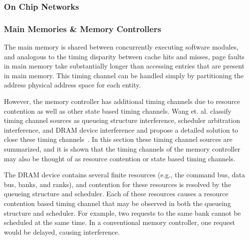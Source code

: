 \subsubsection{On Chip Networks}
\subsubsection{Main Memories \& Memory Controllers}
The main memory is shared between concurrently executing software modules, and 
analogous to the timing disparity between cache hits and misses, page faults in 
main memory take substantially longer than accessing entries that are present 
in main memory. This timing channel can be handled simply by partitioning the 
address physical address space for each entity.

However, the memory controller has additional timing channels due to resource 
contention as well as other state based timing channels. Wang et. al. classify 
timing channel sources as queueing structure interference, scheduler 
arbitration interference, and DRAM device interference and propose a detailed 
solution to close these timing channels~\cite{ushpca14}.  In this section these 
timing channel sources are summarized, and it is shown that the timing channels 
of the memory controller may also be thought of as resource contention or state 
based timing channels.

The DRAM device contains several finite resources (e.g., the command bus, data
bus, banks, and ranks), and contention for these resources is resolved by the 
queueing structure and scheduler. Each of these resources causes a resource 
contention based timing channel that may be observed in both the queueing 
structure and scheduler. For example, two requests to the same bank cannot
be scheduled at the same time. In a conventional memory controller, one request 
would be delayed, causing interference.


